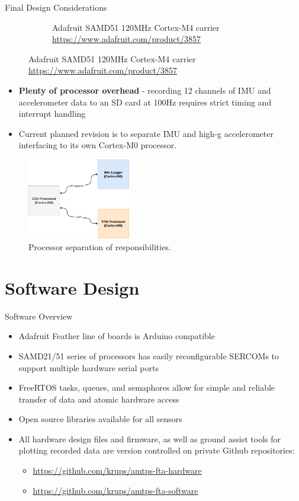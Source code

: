 \documentclass[UKenglish]{beamer}
\begin{document}
\begin{frame}[allowframebreaks]{Final Design Considerations}
\begin{figure}[h!]
\begin{subfigure}{0.4\textwidth}
			\caption{Adafruit SAMD51 120MHz Cortex-M4 carrier \tiny{\url{https://www.adafruit.com/product/3857}}}
		\end{subfigure}
	\end{figure}

	\begin{itemize}
		\item \textbf{Plenty of processor overhead} - recording 12 channels of IMU and accelerometer data to an SD card at 100Hz requires strict timing and interrupt handling
		\item Current planned revision is to separate IMU and high-g accelerometer interfacing to its own Cortex-M0 processor.
	\end{itemize}

	\begin{figure}
		\centering
		\includegraphics[width=0.4\textwidth]{images/amtps-processor-setup.png}
		\caption{Processor separation of responsibilities.}		
	\end{figure}

\end{frame}


\section{Software Design}
\begin{frame}{Software Overview}
	
	\begin{itemize}
		\item Adafruit Feather line of boards is Arduino compatible
		\item SAMD21/51 series of processors has easily reconfigurable SERCOMs to support multiple hardware serial ports 
		\item FreeRTOS tasks, queues, and semaphores allow for simple and reliable transfer of data and atomic hardware access
		\item Open source libraries available for all sensors
		\item All hardware design files and firmware, as well as ground assist tools for plotting recorded data are version controlled on private Github repositories:
		\begin{itemize}
			\item \url{https://github.com/krups/amtps-fta-hardware}
			\item \url{https://github.com/krups/amtps-fta-software}
		\end{itemize}	
	\end{itemize}
	
\end{frame}
\end{document}
